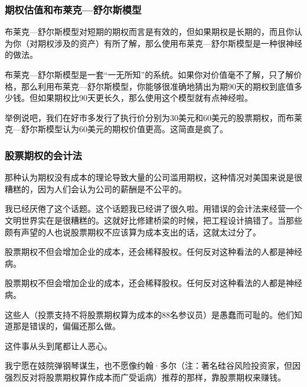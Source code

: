 \subsubsection*{期权估值和布莱克—舒尔斯模型}

布莱克—舒尔斯模型对短期的期权而言是有效的，但如果期权是长期的，而且你认为你（对期权涉及的资产）有所了解，那么使用布莱克—舒尔斯模型是一种很神经的做法。
\par

布莱克—舒尔斯模型是一套“一无所知”的系统。如果你对价值毫不了解，只了解价格，那么利用布莱克—舒尔斯模型，你能够很准确地猜出为期90天的期权到底值多少钱。但如果期权比90天更长久，那么使用这个模型就有点神经啦。
\par

举例说吧，我们在好市多发行了执行价分别为30美元和60美元的股票期权，而布莱克—舒尔斯模型认为60美元的期权价值更高。这简直是疯了。
\par

\subsubsection*{股票期权的会计法}

那种认为期权没有成本的理论导致大量的公司滥用期权，这种情况对美国来说是很糟糕的，因为人们会认为公司的薪酬是不公平的。
\par

我已经厌倦了这个话题。这个话题我已经讲了很久啦。用错误的会计法来经营一个文明世界实在是很糟糕的。这就好比修建桥梁的时候，把工程设计搞错了。当那些颇有声望的人也说股票期权不应该算为成本支出的话，这就太过分了。
\par

股票期权不但会增加企业的成本，还会稀释股权。任何反对这种看法的人都是神经病。
\par

\begin{WisdomBox}
\par

股票期权不但会增加企业的成本，还会稀释股权。任何反对这种看法的人都是神经病。
\par
\end{WisdomBox}

这些人（投票支持不将股票期权算为成本的88名参议员）是愚蠢而可耻的。他们知道那是错误的，偏偏还那么做。
\par

这件事从头到尾都让人恶心。
\par

我宁愿在妓院弹钢琴谋生，也不愿像约翰·多尔（注：著名硅谷风险投资家，但因强烈反对将股票期权算作成本而广受诟病）推荐的那样，靠股票期权来赚钱。
\par

